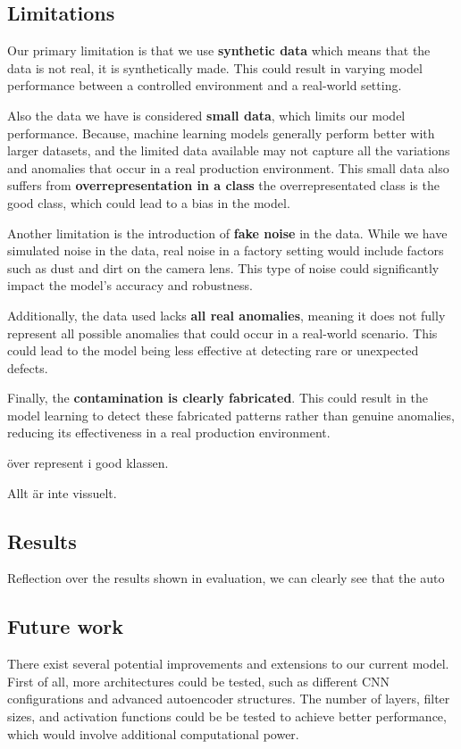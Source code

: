 \subsection{Limitations}

Our primary limitation is that we use \textbf{synthetic data} which means that the data is not real, it is synthetically made.
This could result in varying model performance between a controlled environment and a real-world setting.

Also the data we have is considered \textbf{small data}, which limits our model performance. 
Because, machine learning models generally perform better with larger datasets, and the limited data available may not capture all the variations and anomalies that occur in a real production environment.
This small data also suffers from \textbf{overrepresentation in a class} the overrepresentated class is the good class, which could lead to a bias in the model. 

Another limitation is the introduction of \textbf{fake noise} in the data.
While we have simulated noise in the data, real noise in a factory setting would include factors such as dust and dirt on the camera lens. 
This type of noise could significantly impact the model's accuracy and robustness.

Additionally, the data used lacks \textbf{all real anomalies}, meaning it does not fully represent all possible anomalies that could occur in a real-world scenario. 
This could lead to the model being less effective at detecting rare or unexpected defects.

Finally, the \textbf{contamination is clearly fabricated}.
This could result in the model learning to detect these fabricated patterns rather than genuine anomalies, reducing its effectiveness in a real production environment.

över represent i good klassen.

Allt är inte vissuelt.
\subsection{Results}
Reflection over the results shown in evaluation, we can clearly see that the auto


\subsection{Future work}
There exist several potential improvements and extensions to our current model. 
First of all, more architectures could be tested, such as different CNN configurations and advanced autoencoder structures. 
The number of layers, filter sizes, and activation functions could be be tested to achieve better performance, which would involve additional computational power.

